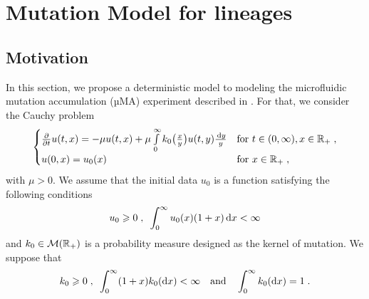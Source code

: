 \section{Mutation Model for lineages}
\label{s:lineage}
    \subsection{Motivation}\mbox{}
    In this section, we propose a deterministic model to modeling the microfluidic mutation accumulation (µMA) experiment described in \cite{robert2018mutation}. For that, we consider the Cauchy problem
    \begin{equation}
        \begin{cases}
        \frac{\partial}{\partial t}u(t,x) = - \mu u(t,x) + \mu \int\limits_{0}^{\infty} k_0\big( \frac{x}{y}\big)u(t,y) \frac{\, \mathrm dy}{y}
        & \text{for } t \in (0, \infty), x \in \mathbb{R}_+ \; ,
        \\
        u(0, x) = u_0(x)
        & \text{for } x \in \mathbb{R}_+
        \; ,
        \end{cases}
        \label{eq:main}
    \end{equation}
    with $\mu > 0$. We assume that the initial data $u_0$ is a function satisfying the following conditions 
    \begin{align}
        \label{H:u0_L1}
        u_0 \geqslant 0 \; , \enspace \int_0^\infty u_0(x)(1+x)\,\mathrm{d} x < \infty
    \end{align}
    and $k_0 \in \mathcal{M}(\mathbb{R}_+)$ is a probability measure designed as the kernel of mutation. We suppose that 
    \begin{align}
        \label{H:k_0}
        k_0 \geqslant 0 \; , \enspace \int_0^\infty (1+x)k_0(\text{d}x) < \infty \quad \text{and} \quad \int_0^\infty k_0(\text{d}x) = 1 \; .
    \end{align}

